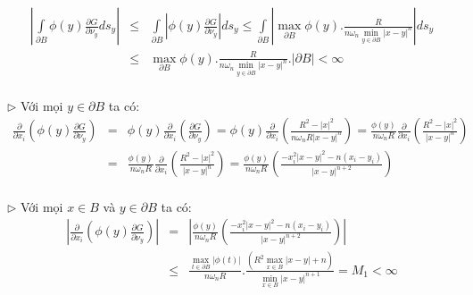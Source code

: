 \begin{eqnarray}
\left| {\int\limits_{\partial B} {\phi \left( y \right)\frac{{\partial G}}
{{\partial \nu _y }}ds_y } } \right| &\leqslant & \int\limits_{\partial B} {\left| {\phi \left( y \right)\frac{{\partial G}}
{{\partial \nu _y }}} \right|ds_y }  \leqslant \int\limits_{\partial B} {\left| {\mathop {\max }\limits_{\partial B} \phi \left( y \right).\frac{R}
{{n\omega _n \mathop {\min }\limits_{y \in \partial B} \left| {x - y} \right|^n }}} \right|ds_y } \nonumber\\
& \leqslant & \mathop {\max }\limits_{\partial B} \phi \left( y \right).\frac{R}
{{n\omega _n \mathop {\min }\limits_{y \in \partial B} \left| {x - y} \right|^n }}.\left| {\partial B} \right| < \infty \nonumber
\end{eqnarray}
\\$\triangleright$ Với mọi $
y \in \partial B
$ ta có:
\begin{eqnarray}
\frac{\partial }
{{\partial x_i }}\left( {\phi \left( y \right)\frac{{\partial G}}
{{\partial \nu _y }}} \right)& =& \phi \left( y \right)\frac{\partial }
{{\partial x_i }}\left( {\frac{{\partial G}}
{{\partial \nu _y }}} \right) = \phi \left( y \right)\frac{\partial }
{{\partial x_i }}\left( {\frac{{R^2  - \left| x \right|^2 }}
{{n\omega _n R\left| {x - y} \right|^n }}} \right) = \frac{{\phi \left( y \right)}}
{{n\omega _n R}}\frac{\partial }
{{\partial x_i }}\left( {\frac{{R^2  - \left| x \right|^2 }}
{{\left| {x - y} \right|^n }}} \right)\nonumber\\
& = &\frac{{\phi \left( y \right)}}
{{n\omega _n R}}\frac{\partial }
{{\partial x_i }}\left( {\frac{{R^2  - \left| x \right|^2 }}
{{\left| {x - y} \right|^n }}} \right) = \frac{{\phi \left( y \right)}}
{{n\omega _n R}}\left( {\frac{{ - x_i^2 \left| {x - y} \right|^2  - n\left( {x_i  - y_i } \right)}}
{{\left| {x - y} \right|^{n + 2} }}} \right)\nonumber
\end{eqnarray}
\\$\triangleright$ Với mọi $
x \in B
$ và $
y \in \partial B
$ ta có:
\begin{eqnarray}
\left| {\frac{\partial }
{{\partial x_i }}\left( {\phi \left( y \right)\frac{{\partial G}}
{{\partial \nu _y }}} \right)} \right| &= &\left| {\frac{{\phi \left( y \right)}}
{{n\omega _n R}}\left( {\frac{{ - x_i^2 \left| {x - y} \right|^2  - n\left( {x_i  - y_i } \right)}}
{{\left| {x - y} \right|^{n + 2} }}} \right)} \right|\nonumber\\
& \leqslant &\frac{{\mathop {\max }\limits_{t \in \partial B} \left| {\phi \left( t \right)} \right|}}
{{n\omega _n R}}.\frac{{\left( {R^2 \mathop {\max }\limits_{x \in B} \left| {x - y} \right| + n} \right)}}
{{\mathop {\min }\limits_{x \in B} \left| {x - y} \right|^{n + 1} }} = M_1  < \infty \nonumber
\end{eqnarray}
